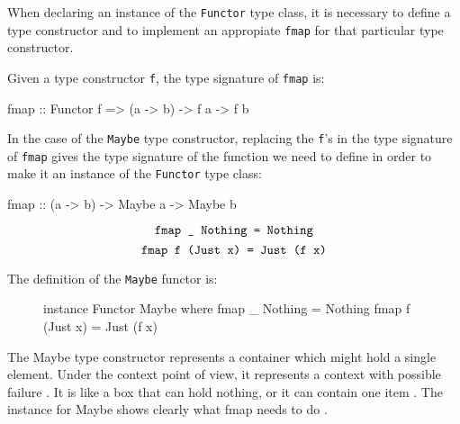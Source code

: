 \begin{example}
  \label{ex:functor-maybe-haskell}


  When declaring an instance of the \texttt{Functor} type class, it is
  necessary to define a type constructor and to implement an
  appropiate \texttt{fmap} for that particular type constructor.

  Given a type constructor \texttt{f}, the type signature of
  \texttt{fmap} is:
  \begin{codehaskell}
    fmap :: Functor f => (a -> b) -> f a -> f b
  \end{codehaskell}
  In the case of the \texttt{Maybe} type constructor, replacing the
  \texttt{f}'s in the type signature of \texttt{fmap} gives the type
  signature of the function we need to define in order to make it an
  instance of the \texttt{Functor} type class:
  \begin{codehaskell}
    fmap :: (a -> b) -> Maybe a -> Maybe b
  \end{codehaskell}

  \begin{equation}
    \label{eq:maybe-fmap-nothing}
    \text{\texttt{fmap \_ Nothing = Nothing}}
  \end{equation}
  \begin{equation}
    \label{eq:maybe-fmap-just}
    \text{\texttt{fmap f (Just x) = Just (f x)}}
  \end{equation}

  The definition of the \texttt{Maybe} functor is:

  \begin{figure}[htbp]
    \begin{codehaskell}
    instance Functor Maybe where
      fmap _ Nothing  = Nothing
      fmap f (Just x) = Just (f x)
    \end{codehaskell}
    \caption{}
    \label{fig:functor-maybe-haskell}
  \end{figure}

The Maybe type constructor represents a container which might hold a
single element. Under the context point of view, it represents a
context with possible failure \parencite{yorgey-2009}. It is like a box
that can hold nothing, or it can contain one item
\parencite{lipovaca-2011}. The instance for Maybe shows
clearly what fmap needs to do \parencite{osullivan-2008}.


\end{example}
